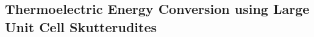 \documentclass[aps,prl,onecolumn,groupedaddress,amsmath,amssymb,12pt]{revtex4}
\begin{document}
\subsection{\label{S-Motivation-Skutterudites}Thermoelectric Energy Conversion using Large Unit Cell Skutterudites}
\end{document}
